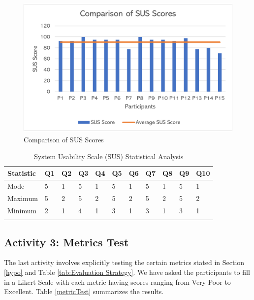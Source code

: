 \begin{figure}[H]
    \centering
    \includegraphics[height=7cm]{Images/SUSScore.png}
    \caption{Comparison of SUS Scores}
    \label{fig:susScore}
    \end{figure}
\begin{longtable}{| p{} | p{} | p{} | p{} | p{} | p{} | p{} | p{} | p{} | p{} | p{} |} 
    \hline
    		\textbf{Statistic}    &\textbf{Q1}    &\textbf{Q2}    &\textbf{Q3}    &\textbf{Q4}    &\textbf{Q5}    &\textbf{Q6}   &\textbf{Q7}    &\textbf{Q8}    &\textbf{Q9}    &\textbf{Q10}   
\\\hline
Mode        &5   &1   &5   &1   &5   &1   &5   &1   &5   & 1 
\\\hline
Maximum     &5   &2   &5   &2   &5   &2   &5   &2   &5   &2  
\\\hline
Minimum     &2   &1   &4   &1   &3   &1   &3   &1   &3   &1  
\\\hline
\caption{System Usability Scale (SUS) Statistical Analysis} \label{susStats}
\end{longtable}

\subsection{Activity 3: Metrics Test}

The last activity involves explicitly testing the certain metrics stated in Section \ref{hypo} and Table \ref{tab:Evaluation Strategy}. We have asked the participants to fill in a Likert Scale with each metric having scores ranging from Very Poor to Excellent. Table \ref{metricTest} summarizes the results. 

